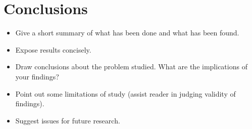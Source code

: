 \chapter{Conclusions}\label{Chap:Conc}

\begin{itemize}

    \item Give a short summary of what has been done and what has been
    found.

    \item Expose results concisely.

    \item Draw conclusions about the problem studied. What are the
    implications of your findings?

    \item Point out some limitations of study (assist reader in judging validity
    of findings).

    \item Suggest issues for future research.

\end{itemize}
